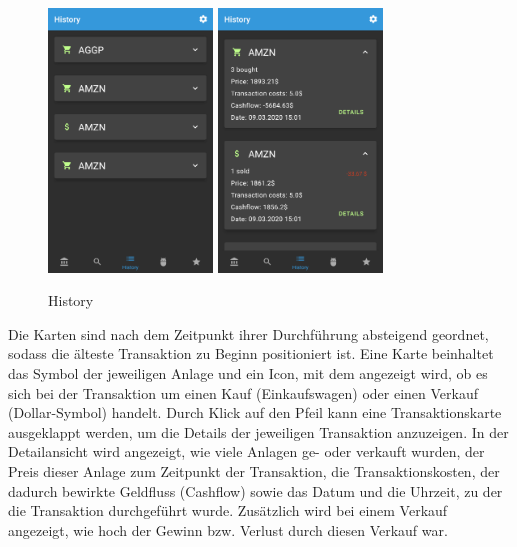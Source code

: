 \documentclass[a4paper]{article}
\begin{document}
\begin{figure}[H]
	\centering
	\includegraphics[height=7cm,keepaspectratio]{./images/history_list.png}
	\includegraphics[height=7cm,keepaspectratio]{./images/history_list_open.png}
	\caption{History}
	\label{fig:functionality:history:list}
\end{figure}

Die Karten sind nach dem Zeitpunkt ihrer Durchführung absteigend geordnet, sodass die älteste Transaktion zu Beginn positioniert ist. Eine Karte beinhaltet das Symbol der jeweiligen Anlage und ein Icon, mit dem angezeigt wird, ob es sich bei der Transaktion um einen Kauf (Einkaufswagen) oder einen Verkauf (Dollar-Symbol) handelt. Durch Klick auf den Pfeil kann eine Transaktionskarte ausgeklappt werden, um die Details der jeweiligen Transaktion anzuzeigen. In der Detailansicht wird angezeigt, wie viele Anlagen ge- oder verkauft wurden, der Preis dieser Anlage zum Zeitpunkt der Transaktion, die Transaktionskosten, der dadurch bewirkte Geldfluss (Cashflow) sowie das Datum und die Uhrzeit, zu der die Transaktion durchgeführt wurde. Zusätzlich wird bei einem Verkauf angezeigt, wie hoch der Gewinn bzw. Verlust durch diesen Verkauf war.
\end{document}
